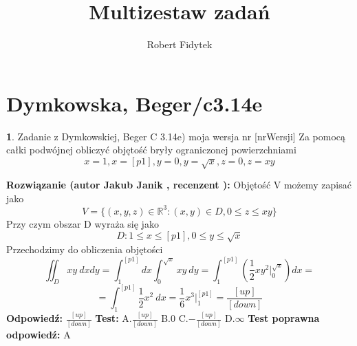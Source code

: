 \documentclass[12pt, a4paper]{article}
\title{Multizestaw zadań}
\author{Robert Fidytek}
\date{}
\theoremstyle{definition} %
\newtheorem{zad}{}
\newcommand{\kategoria}[1]{\section{#1}} %
\newcommand{\zadStart}[1]{\begin{zad}#1\newline} %
\newcommand{\zadStop}{\end{zad}}   %
\newcommand{\rozwStart}[2]{\noindent \textbf{Rozwiązanie (autor #1 , recenzent #2): }\newline} %
\newcommand{\rozwStop}{\newline}                                            %
\newcommand{\odpStart}{\noindent \textbf{Odpowiedź:}\newline}    %
\newcommand{\odpStop}{\newline}                                             %
\newcommand{\testStart}{\noindent \textbf{Test:}\newline} %
\newcommand{\testStop}{\newline} %
\newcommand{\kluczStart}{\noindent \textbf{Test poprawna odpowiedź:}\newline} %
\newcommand{\kluczStop}{\newline} %
\begin{document}
\maketitle


\kategoria{Dymkowska, Beger/c3.14e}
\zadStart{Zadanie z Dymkowskiej, Beger C 3.14e) moja wersja nr [nrWersji]}
Za pomocą całki podwójnej obliczyć objętość bryły ograniczonej powierzchniami $$x=1, x=[p1], y=0, y=\sqrt{x}, z=0, z=xy$$
\zadStop
\rozwStart{Jakub Janik}{}
Objętość V możemy zapisać jako
$$V=\{(x,y,z)\in\mathbb{R}^3\colon(x,y)\in D, 0 \leq z \leq xy\}$$
Przy czym obszar D wyraża się jako
$$D\colon 1 \leq x \leq [p1], 0 \leq y \leq \sqrt{x}$$
Przechodzimy do obliczenia objętości
$$\iint_D xy\ dxdy=\int_1^{[p1]}dx\int_0^{\sqrt{x}}xy\ dy=\int_1^{[p1]}(\frac{1}{2}xy^2\Big|_0^{\sqrt{x}})dx=$$
$$=\int_1^{[p1]}\frac{1}{2}x^2\ dx=\frac{1}{6}x^3\Big|_1^{[p1]}=\frac{[up]}{[down]}$$
\rozwStop
\odpStart
$\frac{[up]}{[down]}$
\odpStop
\testStart
A.$\frac{[up]}{[down]}$
B.$0$
C.$-\frac{[up]}{[down]}$
D.$\infty$
\testStop
\kluczStart
A
\kluczStop
\end{document}
